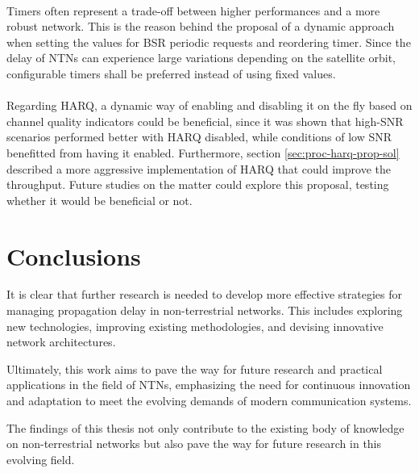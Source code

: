 \paragraph{}
Timers often represent a trade-off between higher performances and a more robust network. This is the reason behind the proposal of a dynamic approach when setting the values for \ac{BSR} periodic requests and reordering timer. Since the delay of \ac{NTN}s can experience large variations depending on the satellite orbit, configurable timers shall be preferred instead of using fixed values.

\paragraph{}
Regarding \ac{HARQ}, a dynamic way of enabling and disabling it on the fly based on channel quality indicators could be beneficial, since it was shown that high-\ac{SNR} scenarios performed better with \ac{HARQ} disabled, while conditions of low \ac{SNR} benefitted from having it enabled. Furthermore, section \ref{sec:proc-harq-prop-sol} described a more aggressive implementation of \ac{HARQ} that could improve the throughput. Future studies on the matter could explore this proposal, testing whether it would be beneficial or not.


\section{Conclusions}
It is clear that further research is needed to develop more effective strategies for managing propagation delay in non-terrestrial networks. This includes exploring new technologies, improving existing methodologies, and devising innovative network architectures.

Ultimately, this work aims to pave the way for future research and practical applications in the field of \ac{NTN}s, emphasizing the need for continuous innovation and adaptation to meet the evolving demands of modern communication systems. 

The findings of this thesis not only contribute to the existing body of knowledge on non-terrestrial networks but also pave the way for future research in this evolving field.
